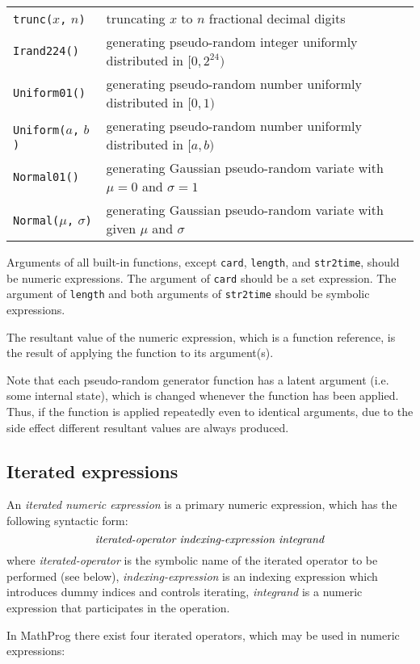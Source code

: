 \documentclass[11pt]{report}
\begin{document}
\begin{tabular}{@{}p{112pt}p{328pt}@{}}
{\tt trunc(}$x${\tt,} $n${\tt)}&truncating $x$ to $n$ fractional
decimal digits\\
{\tt Irand224()}&generating pseudo-random integer uniformly distributed
in $[0,2^{24})$\\
{\tt Uniform01()}&generating pseudo-random number uniformly distributed
in $[0,1)$\\
{\tt Uniform(}$a${\tt,} $b${\tt)}&generating pseudo-random number
uniformly distributed in $[a,b)$\\
{\tt Normal01()}&generating Gaussian pseudo-random variate with
$\mu=0$ and $\sigma=1$\\
{\tt Normal(}$\mu${\tt,} $\sigma${\tt)}&generating Gaussian
pseudo-random variate with given $\mu$ and $\sigma$\\
\end{tabular}

Arguments of all built-in functions, except {\tt card}, {\tt length},
and {\tt str2time}, should be numeric expressions. The argument of
{\tt card} should be a set expression. The argument of {\tt length} and
both arguments of {\tt str2time} should be symbolic expressions.

The resultant value of the numeric expression, which is a function
reference, is the result of applying the function to its argument(s).

Note that each pseudo-random generator function has a latent argument
(i.e. some internal state), which is changed whenever the function has
been applied. Thus, if the function is applied repeatedly even to
identical arguments, due to the side effect different resultant values
are always produced.

\newpage

\subsection{Iterated expressions}
\label{itexpr}

An {\it iterated numeric expression} is a primary numeric expression,
which has the following syntactic form:
$$\mbox{\it iterated-operator indexing-expression integrand}$$
where {\it iterated-operator} is the symbolic name of the iterated
operator to be performed (see below), {\it indexing-expression} is an
indexing expression which introduces dummy indices and controls
iterating, {\it integrand} is a numeric expression that participates in
the operation.

In MathProg there exist four iterated operators, which may be used in
numeric expressions:
\end{document}
